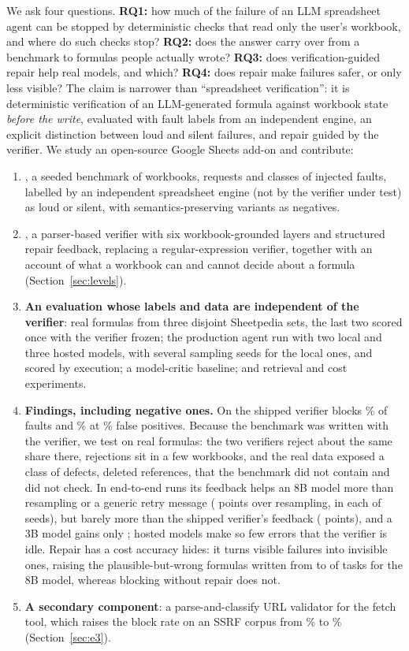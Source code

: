 We ask four questions. \textbf{RQ1:} how much of the failure of an LLM spreadsheet agent can be stopped by deterministic checks that read only the user's workbook, and where do such checks stop? \textbf{RQ2:} does the answer carry over from a benchmark to formulas people actually wrote? \textbf{RQ3:} does verification-guided repair help real models, and which? \textbf{RQ4:} does repair make failures safer, or only less visible? The claim is narrower than ``spreadsheet verification'': it is deterministic verification of an LLM-generated formula against workbook state \emph{before the write}, evaluated with fault labels from an independent engine, an explicit distinction between loud and silent failures, and repair guided by the verifier. We study an open-source Google Sheets add-on and contribute:
\begin{enumerate}\itemsep0pt
\item \textbf{\sheetfault}, a seeded benchmark of workbooks, requests and \nBenchClasses{} classes of injected faults, labelled by an independent spreadsheet engine (not by the verifier under test) as loud or silent, with semantics-preserving variants as negatives.
\item \textbf{\gc}, a parser-based verifier with six workbook-grounded layers and structured repair feedback, replacing a regular-expression verifier, together with an account of what a workbook can and cannot decide about a formula (Section~\ref{sec:levels}).
\item \textbf{An evaluation whose labels and data are independent of the verifier}: real formulas from three disjoint Sheetpedia sets, the last two scored once with the verifier frozen; the production agent run with two local and three hosted models, with several sampling seeds for the local ones, and scored by execution; a model-critic baseline; and retrieval and cost experiments.
\item \textbf{Findings, including negative ones.} On \sheetfault{} the shipped verifier blocks \eonevonerejectR\% of faults and \gc{} \eonevtworejectR\% at \eonevtworejectFPR\% false positives. Because the benchmark was written with the verifier, we test on real formulas: the two verifiers reject about the same share there, rejections sit in a few workbooks, and the real data exposed a class of defects, deleted references, that the benchmark did not contain and \gc{} did not check. In end-to-end runs its feedback helps an 8B model more than resampling or a generic retry message (\sdADvtwofbresample{} points over resampling, in each of \sdASeeds{} seeds), but barely more than the shipped verifier's feedback (\sdADvtwofbvonefb{} points), and a 3B model gains only \sdBDvtwofbresample{}; hosted models make so few errors that the verifier is idle. Repair has a cost accuracy hides: it turns visible failures into invisible ones, raising the plausible-but-wrong formulas written from \hmAAsIsSilent{} to \hmARepVtwoSilent{} of \hmAN{} tasks for the 8B model, whereas blocking without repair does not.
\item \textbf{A secondary component}: a parse-and-classify URL validator for the fetch tool, which raises the block rate on an SSRF corpus from \ssrfvoneRecall\% to \ssrfvtwoRecall\% (Section~\ref{sec:e3}).
\end{enumerate}
